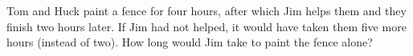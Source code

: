 Tom and Huck paint a fence for four hours, after which Jim helps them and they finish two hours later. If Jim had not helped, it would have taken them five more hours (instead of two). How long would Jim take to paint the fence alone?
